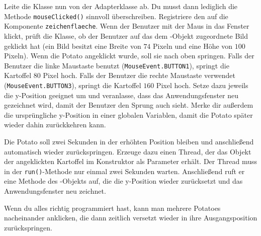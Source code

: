 Leite die Klasse  nun von der Adapterklasse
 ab. Du musst dann lediglich die Methode
\lstinline|mouseClicked()| sinnvoll überschreiben. Registriere den
 auf die Komponente \lstinline|zeichenflaeche|. Wenn der
Benutzer mit der Maus in das Fenster klickt, prüft die Klasse, ob der Benutzer
auf das dem -Objekt zugeordnete Bild geklickt hat (ein Bild
besitzt eine Breite von $74$ Pixeln und eine Höhe von $100$ Pixeln). Wenn die
Potato angeklickt wurde, soll sie nach oben springen. Falls der Benutzer die
linke Maustaste benutzt (\lstinline|MouseEvent.BUTTON1|), springt die Kartoffel
$80$ Pixel hoch. Falls der Benutzer die rechte Maustaste verwendet
(\lstinline|MouseEvent.BUTTON3|), springt die Kartoffel $160$ Pixel hoch. Setze
dazu jeweils die y-Position geeignet um und veranlasse, dass das
Anwendungsfenster neu gezeichnet wird, damit der Benutzer den Sprung auch
sieht. Merke dir außerdem die ursprüngliche y-Position in einer globalen
Variablen, damit die Potato später wieder dahin zurückkehren kann.

Die Potato soll zwei Sekunden in der erhöhten Position bleiben und anschließend
automatisch wieder zurückspringen. Erzeuge dazu einen Thread, der das Objekt
der angeklickten Kartoffel im Konstruktor als Parameter erhält. Der Thread muss
in der \lstinline|run()|-Methode nur einmal zwei Sekunden warten. Anschließend
ruft er eine Methode des -Objekts auf, die die y-Position wieder
zurücksetzt und das Anwendungsfenster neu zeichnet.

Wenn du alles richtig programmiert hast, kann man mehrere Potatoes nacheinander
anklicken, die dann zeitlich versetzt wieder in ihre Ausgangsposition
zurückspringen.
